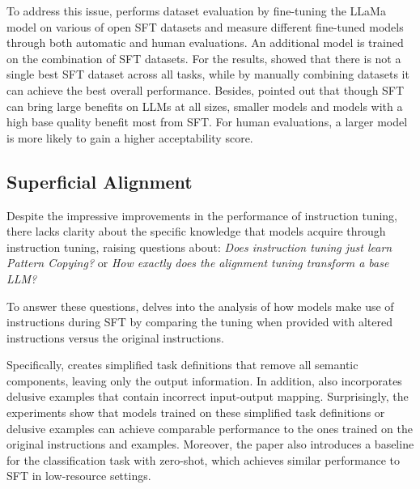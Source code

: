 \documentclass[11pt]{article}
\begin{document}
To address this issue, \citet{Wang2023HowFC} performs dataset evaluation by 
fine-tuning the LLaMa model \cite{touvron2023llama} on various of open SFT datasets and measure different fine-tuned models through both automatic and human evaluations. 
An additional model is trained on the combination of SFT datasets. 
For the results, \citet{Wang2023HowFC} showed that there is not a single best SFT dataset across all tasks, while by manually combining datasets it can achieve the best overall performance. Besides, \citet{Wang2023HowFC} pointed out that though SFT can bring large benefits on LLMs at all sizes, smaller models and models with a high base quality benefit most from SFT. For human evaluations, \citet{Wang2023HowFC} a larger model is more likely to gain a higher acceptability score.

\subsection{Superficial Alignment}

Despite the impressive improvements in the performance of instruction tuning, there lacks clarity about the specific knowledge that models acquire through instruction tuning, raising questions about:
\textit{Does instruction tuning just learn Pattern Copying?} or \textit{How exactly does the alignment tuning transform a base LLM?}

To answer these questions, 
\citet{Kung2023DoMR} delves into the analysis of how models make use of instructions during SFT by comparing the tuning when provided with altered instructions versus the original instructions.

Specifically, \citet{Kung2023DoMR} creates simplified task definitions that remove all semantic components, leaving only the output information. In addition, \citet{Kung2023DoMR} also incorporates delusive examples that contain incorrect input-output mapping. Surprisingly, the experiments show that models trained on these simplified task definitions or delusive examples can achieve comparable performance to the ones trained on the original instructions and examples. Moreover, the paper also introduces a baseline for the classification task with zero-shot, which achieves similar performance to SFT in low-resource settings.
\end{document}

